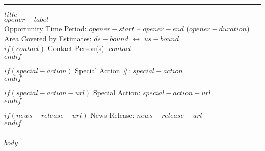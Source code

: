 \documentclass[letterpaper,11pt,$for(classoption)$$classoption$$sep$,$endfor$]{article}
\begin{document}
\rule{\textwidth}{1pt}
\begin{flushleft}

{\bf\LARGE{$title$}}\\
{\Large{$opener-label$}}\\

{\small{Opportunity Time Period: $opener-start$ -- $opener-end$ ($opener-duration$)}}\\

{\small{Area Covered by Estimates: $ds-bound$ \( \longleftrightarrow \) $us-bound$}}\\

$if(contact)$
{\small{Contact Person(s): $contact$}}\\
$endif$

$if(special-action)$
{\small{Special Action \#: $special-action$}}\\
$endif$

$if(special-action-url)$
{\small{Special Action: $special-action-url$}}\\
$endif$

$if(news-release-url)$
{\small{News Release: $news-release-url$}}\\
$endif$
\end{flushleft}
\vspace{-10pt}
\rule{\textwidth}{1pt}

$body$

\end{document}
